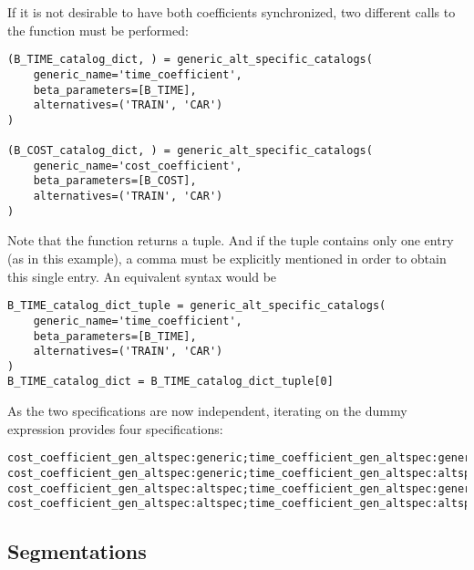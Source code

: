 \documentclass[12pt,a4paper]{article}
\begin{document}
If it is not desirable to have both coefficients synchronized, two different calls to the function must be performed:
\begin{lstlisting}
(B_TIME_catalog_dict, ) = generic_alt_specific_catalogs(
    generic_name='time_coefficient',
    beta_parameters=[B_TIME],
    alternatives=('TRAIN', 'CAR')
)

(B_COST_catalog_dict, ) = generic_alt_specific_catalogs(
    generic_name='cost_coefficient',
    beta_parameters=[B_COST],
    alternatives=('TRAIN', 'CAR')
)
\end{lstlisting}
Note that the function returns a tuple. And if the tuple contains only one entry (as in this example), a comma must be explicitly mentioned in order to obtain this single entry. An equivalent syntax would be
\begin{lstlisting}
B_TIME_catalog_dict_tuple = generic_alt_specific_catalogs(
    generic_name='time_coefficient',
    beta_parameters=[B_TIME],
    alternatives=('TRAIN', 'CAR')
)
B_TIME_catalog_dict = B_TIME_catalog_dict_tuple[0]
\end{lstlisting}
As the two specifications are now independent, iterating on the dummy
expression provides four specifications:
\begin{lstlisting}
cost_coefficient_gen_altspec:generic;time_coefficient_gen_altspec:generic
cost_coefficient_gen_altspec:generic;time_coefficient_gen_altspec:altspec
cost_coefficient_gen_altspec:altspec;time_coefficient_gen_altspec:generic
cost_coefficient_gen_altspec:altspec;time_coefficient_gen_altspec:altspec
\end{lstlisting}

\subsection{Segmentations}
\end{document}

